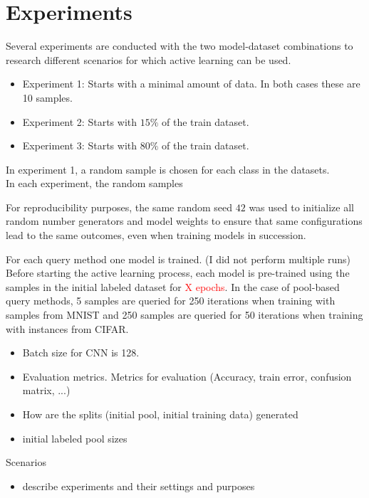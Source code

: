 \documentclass{article}
\theoremstyle{plain}
\theoremstyle{definition}
\theoremstyle{remark}
\begin{document}
\section{Experiments}\label{sec:experiments}
Several experiments are conducted with the two model-dataset combinations to research different scenarios for which active learning can be used.
\begin{itemize}
	\item Experiment 1: Starts with a minimal amount of data. In both cases these are 10 samples.
	\item Experiment 2: Starts with $15\%$ of the train dataset. 
	\item Experiment 3: Starts with $80\%$ of the train dataset.
\end{itemize}
In experiment 1, a random sample is chosen for each class in the datasets. \\
In each experiment, the random samples 

For reproducibility purposes, the same random seed $42$ was used to initialize all random number generators and model weights to ensure that same configurations lead to the same outcomes, even when training models in succession. 

For each query method one model is trained. (I did not perform multiple runs)
Before starting the active learning process, each model is pre-trained using the samples in the initial labeled dataset for \textcolor{red}{X epochs}. In the case of pool-based query methods, 5 samples are queried for 250 iterations when training with samples from MNIST and 250 samples are queried for 50 iterations when training with instances from CIFAR. 
\\
\begin{itemize}
	\item Batch size for CNN is 128.
	\item Evaluation metrics. Metrics for evaluation (Accuracy, train error, confusion matrix, ...)
	\item How are the splits (initial pool, initial training data) generated
	\item initial labeled pool sizes
\end{itemize}
	
	

Scenarios
\begin{itemize}
	\item describe experiments and their settings and purposes
\end{itemize}
\end{document}
